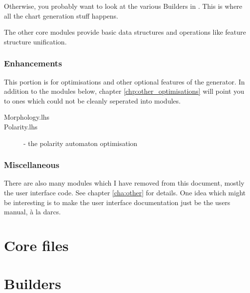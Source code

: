 \documentclass[a4paper,11pt]{report}
\begin{document}
Otherwise, you probably want to look at the various Builders in
\ref{prt:builders}.  This is where all the chart generation stuff
happens.

The other core modules provide basic data structures and operations
like feature structure unification.

\section{Enhancements}

This portion is for optimisations and other optional features of the
generator.
In addition to the modules below, chapter \ref{chp:other_optimisations}
will point you to ones which could not be cleanly seperated into
modules.

\begin{description}
 \item[Morphology.lhs]
 \item[Polarity.lhs]   - the polarity automaton optimisation 
\end{description}

\section{Miscellaneous}

There are also many modules which I have removed from this document,
mostly the user interface code.  See chapter \ref{cha:other} for
details.  One idea which might be interesting is to make the user
interface documentation just be the users manual, \`a la darcs.




\part{Core files}









\part{Builders}
\label{prt:builders}
\end{document}
